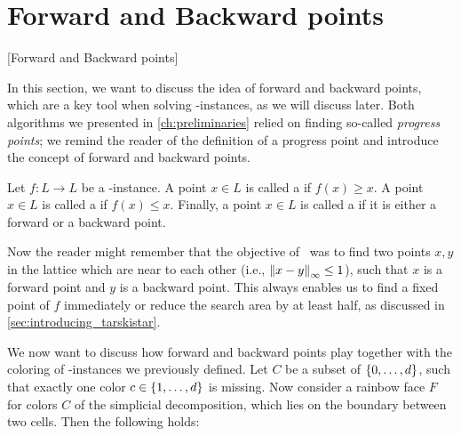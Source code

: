 \section{Forward and Backward points}[Forward and Backward points]

In this section, we want to discuss the idea of forward and backward points, which are a key tool when solving \Tarski-instances, as we will discuss later. Both algorithms we presented in \cref{ch:preliminaries} relied on finding so-called \emph{progress points}; we remind the reader of the definition of a progress point and introduce the concept of forward and backward points.

\begin{definition}
	Let $f: L \rightarrow L$ be a \Tarski-instance. A point $x \in L$ is called a  if $f(x) \geq x$. A point $x \in L$ is called a  if $f(x) \leq x$. Finally, a point $x \in L$ is called a  if it is either a forward or a backward point.
\end{definition}

Now the reader might remember that the objective of \Tarskistar\ was to find two points $x, y$ in the lattice which are near to each other (i.e., $\left\lVert x-y\right\rVert_{\infty}\leq 1$), such that $x$ is a forward point and $y$ is a backward point. This always enables us to find a fixed point of $f$ immediately or reduce the search area by at least half, as discussed in \cref{sec:introducing_tarskistar}.

We now want to discuss how forward and backward points play together with the coloring of \Tarski-instances we previously defined. Let $C$ be a subset of $\left\{0, \dots, d\right\}$, such that exactly one color $c \in \left\{1, \dots, d\right\}$ is missing. Now consider a rainbow face $F$ for colors $C$ of the simplicial decomposition, which lies on the boundary between two cells. Then the following holds:


